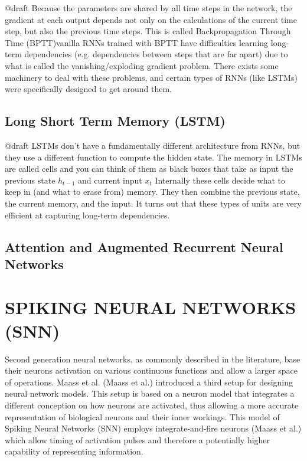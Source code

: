 \documentclass[letterpaper, 10 pt, conference]{ieeeconf}  %
\begin{document}
@draft 
Because the parameters are shared by all time steps in the network, the gradient at each output 
depends not only on the calculations of the current time step, but also the previous time steps.
This is called Backpropagation Through Time (BPTT)vanilla RNNs trained with BPTT have difficulties 
learning long-term dependencies (e.g. dependencies between steps that are far apart) due to what 
is called the vanishing/exploding gradient problem. There exists some machinery to deal with 
these problems, and certain types of RNNs (like LSTMs) were specifically designed to get around them.


\subsection{Long Short Term Memory (LSTM)}

@draft 
LSTMs don’t have a fundamentally different architecture from RNNs, but they use a different 
function to compute the hidden state. The memory in LSTMs are called cells and you can think 
of them as black boxes that take as input the previous state $h_{t-1}$ and current input $x_{t}$
Internally these cells  decide what to keep in (and what to erase from) memory. They then 
combine the previous state, the current memory, and the input. It turns out that these types of 
units are very efficient at capturing long-term dependencies.

\subsection{Attention and Augmented Recurrent Neural Networks}


\section{SPIKING NEURAL NETWORKS (SNN)}

Second generation neural networks, as commonly described in the literature, base their neurons activation on various continuous functions 
and allow a larger space of operations. Maass et al. (Maass et al.) introduced a third setup for 
designing neural network models. This setup is based on a neuron model that integrates a different conception on how neurons are activated,
thus allowing a more accurate representation of biological neurons and their inner workings. This model of Spiking Neural Networks (SNN) employs
integrate-and-fire neurons (Maass et al.) which allow timing of activation pulses and therefore a potentially higher capability of representing 
information. 
\end{document}
